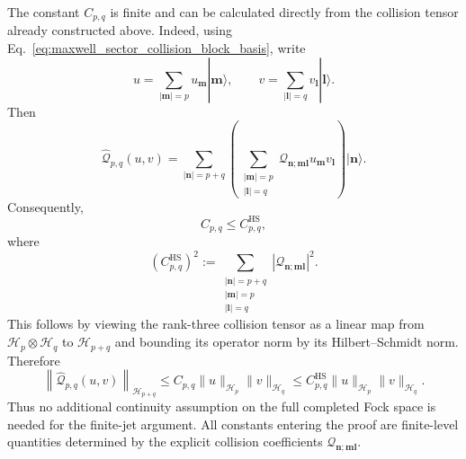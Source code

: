 \documentclass[11pt,oneside]{article}
\numberwithin{equation}{section}
\theoremstyle{definition}
\begin{document}
The constant $C_{p,q}$ is finite and can be calculated directly from the
collision tensor already constructed above.  Indeed, using
Eq.~\eqref{eq:maxwell_sector_collision_block_basis}, write
\begin{equation}
u
=
\sum_{|\bm m|=p}u_{\bm m}|\bm m\rangle,
\qquad
v
=
\sum_{|\bm l|=q}v_{\bm l}|\bm l\rangle .
\end{equation}
Then
\begin{equation}
\widehat{\mathcal Q}_{p,q}(u,v)
=
\sum_{|\bm n|=p+q}
\left(
\sum_{\substack{|\bm m|=p\\|\bm l|=q}}
\mathcal Q_{\bm n;\bm m\bm l}
u_{\bm m}v_{\bm l}
\right)
|\bm n\rangle .
\label{eq:maxwell_jet_Qpq_components}
\end{equation}
Consequently,
\begin{equation}
C_{p,q}
\leq
C_{p,q}^{\mathrm{HS}},
\label{eq:maxwell_jet_Cpq_HS_bound}
\end{equation}
where
\begin{equation}
\left(
C_{p,q}^{\mathrm{HS}}
\right)^2
:=
\sum_{\substack{|\bm n|=p+q\\
|\bm m|=p\\
|\bm l|=q}}
\left|
\mathcal Q_{\bm n;\bm m\bm l}
\right|^2 .
\label{eq:maxwell_jet_Cpq_HS}
\end{equation}
This follows by viewing the rank-three collision tensor as a linear map
from
$\mathscr H_p\otimes\mathscr H_q$ to $\mathscr H_{p+q}$ and bounding its
operator norm by its Hilbert--Schmidt norm.  Therefore
\begin{equation}
\left\|
\widehat{\mathcal Q}_{p,q}(u,v)
\right\|_{\mathscr H_{p+q}}
\leq
C_{p,q}
\|u\|_{\mathscr H_p}
\|v\|_{\mathscr H_q}
\leq
C_{p,q}^{\mathrm{HS}}
\|u\|_{\mathscr H_p}
\|v\|_{\mathscr H_q}.
\label{eq:maxwell_jet_bilinear_bound}
\end{equation}
Thus no additional continuity assumption on the full completed Fock space
is needed for the finite-jet argument.  All constants entering the proof
are finite-level quantities determined by the explicit collision
coefficients
$\mathcal Q_{\bm n;\bm m\bm l}$.
\end{document}
